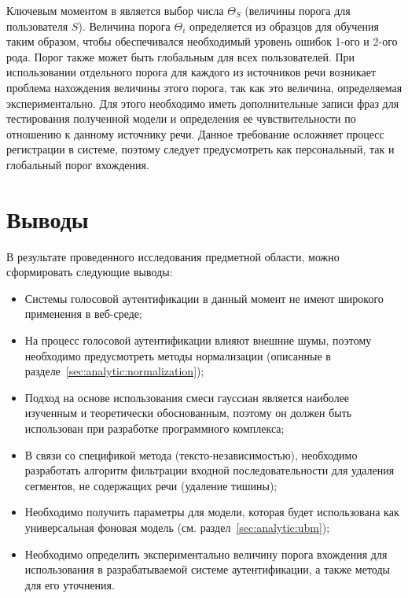 Ключевым моментом в  является выбор числа $\Theta_{S}$ (величины порога для пользователя $S$). Величина порога $\Theta_i$ определяется из образцов для обучения таким образом, чтобы обеспечивался необходимый уровень ошибок 1-ого и 2-ого рода. Порог также может быть глобальным для всех пользователей. При использовании отдельного порога для каждого из источников речи возникает проблема нахождения величины этого порога, так как это величина, определяемая экспериментально. Для этого необходимо иметь дополнительные записи фраз для тестирования полученной модели и определения ее чувствительности по отношению к данному источнику речи. Данное требование осложняет процесс регистрации в системе, поэтому следует предусмотреть как персональный, так и глобальный порог вхождения.

\section{Выводы}
\label{sec:analytic:conclusion}

В результате проведенного исследования предметной области, можно сформировать следующие выводы:

\begin{itemize}
\item Системы голосовой аутентификации в данный момент не имеют широкого применения в веб-среде;
\item На процесс голосовой аутентификации влияют внешние шумы, поэтому необходимо предусмотреть методы нормализации (описанные в разделе~\ref{sec:analytic:normalization});
\item Подход на основе использования смеси гауссиан является наиболее изученным и теоретически обоснованным, поэтому он должен быть использован при разработке программного комплекса;
\item В связи со спецификой метода (тексто-независимостью), необходимо разработать алгоритм фильтрации входной последовательности для удаления сегментов, не содержащих речи (удаление тишины);
\item Необходимо получить параметры для модели, которая будет использована как универсальная фоновая модель (см. раздел~\ref{sec:analytic:ubm});
\item Необходимо определить экспериментально величину порога вхождения для использования в разрабатываемой системе аутентификации, а также методы для его уточнения.
\end{itemize}

